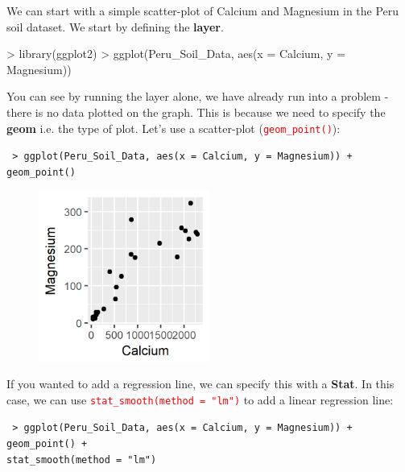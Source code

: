 \documentclass[a4paper,12pt]{article}
\newcommand\code[1]{\textcolor{red}{\texttt{#1}}}
\begin{document}
We can start with a simple scatter-plot of Calcium and Magnesium in the Peru soil dataset. We start by defining the \textbf{layer}.



\begin{shaded}
\begin{Schunk}
\begin{Sinput}
> library(ggplot2)
> ggplot(Peru_Soil_Data, aes(x = Calcium, y = Magnesium))
\end{Sinput}
\end{Schunk}
\end{shaded}

You can see by running the layer alone, we have already run into a problem - there is no data plotted on the graph. This is because we need to specify the \textbf{geom} i.e. the type of plot. Let's use a scatter-plot (\code{geom\_point()}):

\begin{shaded}
\texttt{ > ggplot(Peru\_Soil\_Data, aes(x = Calcium, y = Magnesium)) + \\
\hspace*{1cm} geom\_point()}
\end{shaded}

\begin{figure}[h]
	\centering
	\includegraphics[width=0.5\textwidth]{figs/fig1.png}
	\label{fig:fig1}
\end{figure}

If you wanted to add a regression line, we can specify this with a \textbf{Stat}. In this case, we can use \code{stat\_smooth(method = "lm")} to add a linear regression line:

\begin{shaded}
\texttt{ > ggplot(Peru\_Soil\_Data, aes(x = Calcium, y = Magnesium)) + \\
\hspace*{1cm} geom\_point() + \\
\hspace*{1cm} stat\_smooth(method = "lm")}
\end{shaded}
\end{document}
